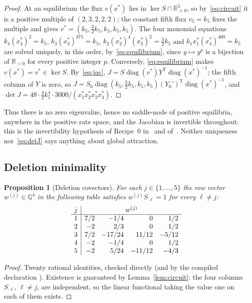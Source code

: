 \documentclass[11pt,a4paper]{article}
\theoremstyle{plain}
\newtheorem{proposition}[theorem]{Proposition}
\theoremstyle{definition}
\theoremstyle{remark}
\newcommand{\R}{\mathbb{R}}
\newcommand{\Q}{\mathbb{Q}}
\newcommand{\diag}{\operatorname{diag}}
\newcommand{\xs}{x^{*}}
\newcommand{\vs}{v^{*}}
\begin{document}
\begin{proof}
At an equilibrium the flux $v(\xs)$ lies in $\ker S\cap\R_{>0}^5$, so by~\eqref{eq:circuit} it is a positive multiple of $(2,3,2,2,2)$; the constant fifth flux $v_5=k_5$ fixes the multiple and gives $\vs=(k_5,\tfrac32k_5,k_5,k_5,k_5)$. The four monomial equations $k_4(x_4^*)^2=k_5$, $k_3(x_3^*)^{375}=k_5$, $k_2(x_2^*)^4(x_3^*)^2=\tfrac32k_5$ and $k_1x_1^*(x_4^*)^{400}=k_5$ are solved uniquely, in this order, by~\eqref{eq:equilibrium}, since $y\mapsto y^p$ is a bijection of $\R_{>0}$ for every positive integer $p$. Conversely, \eqref{eq:equilibrium} makes $v(\xs)=\vs\in\ker S$. By~\eqref{eq:jac}, $J=S\diag(\vs)Y^{\mathsf T}\diag(\xs)^{-1}$; the fifth column of $Y$ is zero, so $J=S_0\diag(k_5,\tfrac32k_5,k_5,k_5)(Y_0')^{\mathsf T}\diag(\xs)^{-1}$, and $\det J=48\cdot\tfrac32k_5^4\cdot3000/(x_1^*x_2^*x_3^*x_4^*)$.
\end{proof}

Thus there is no zero eigenvalue, hence no saddle-node of positive equilibria, anywhere in the positive rate space, and the Jacobian is invertible throughout: this is the invertibility hypothesis of Recipe~0 in~\cite{BSV2025} and of~\cite[Theorem~5.2]{Vassena2025Hopf}. Neither uniqueness nor~\eqref{eq:detJ} says anything about global attraction.

\subsection{Deletion minimality}\label{sec:deletion}

\begin{proposition}[Deletion covectors]\label{prop:covectors}
For each $j\in\{1,\dots,5\}$ the row vector $w^{(j)}\in\Q^4$ in the following table satisfies $w^{(j)}S_{\cdot\ell}=1$ for every $\ell\ne j$:
\begin{equation}\label{eq:weights}
\begin{array}{c|rrrr}
j&\multicolumn{4}{c}{w^{(j)}}\\\hline
1&7/2&-1/4&0&1/2\\
2&-2&2/3&0&1/2\\
3&7/2&-17/24&11/12&-5/12\\
4&-2&-1/4&0&1/2\\
5&-2&5/24&-11/12&-4/3
\end{array}
\end{equation}
\end{proposition}

\begin{proof}
Twenty rational identities, checked directly (and by the compiled declaration ). Existence is guaranteed by Lemma~\ref{lem:circuit}: the four columns $S_{\cdot\ell}$, $\ell\ne j$, are independent, so the linear functional taking the value one on each of them exists.
\end{proof}
\end{document}
